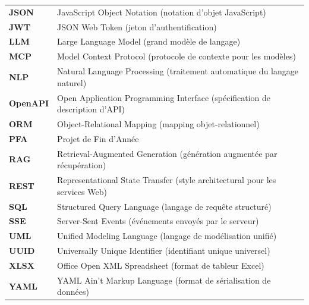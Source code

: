 \begin{tabularx}{\textwidth}{>{\bfseries}p{3.0cm}X}
JSON & JavaScript Object Notation (notation d'objet JavaScript) \\

JWT & JSON Web Token (jeton d'authentification) \\

LLM & Large Language Model (grand modèle de langage) \\

MCP & Model Context Protocol (protocole de contexte pour les modèles) \\

NLP & Natural Language Processing (traitement automatique du langage naturel) \\

OpenAPI & Open Application Programming Interface (spécification de description d'API) \\

ORM & Object-Relational Mapping (mapping objet-relationnel) \\

PFA & Projet de Fin d'Année \\

RAG & Retrieval-Augmented Generation (génération augmentée par récupération) \\

REST & Representational State Transfer (style architectural pour les services Web) \\

SQL & Structured Query Language (langage de requête structuré) \\

SSE & Server-Sent Events (événements envoyés par le serveur) \\



UML & Unified Modeling Language (langage de modélisation unifié) \\


UUID & Universally Unique Identifier (identifiant unique universel) \\

XLSX & Office Open XML Spreadsheet (format de tableur Excel) \\

YAML & YAML Ain't Markup Language (format de sérialisation de données) \\

\bottomrule
\end{tabularx}

\normalsize